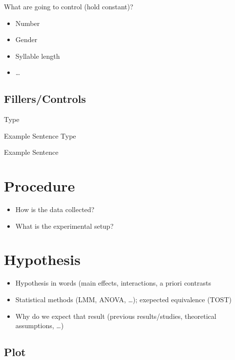 \documentclass[
    numbers=noenddot,
    open=any,
    paper=a4,
    oneside,
    pagesize,
    captions=tableheading,
    bibliography=totoc,
    11pt
    ]{scrbook}
\providecommand{\tightlist}{%
    \setlength{\itemsep}{0pt}\setlength{\parskip}{0pt}}
\begin{document}
What are going to control (hold constant)?

\begin{itemize}
\tightlist
\item
  Number
\item
  Gender
\item
  Syllable length
\item
  \ldots
\end{itemize}

\hypertarget{fillerscontrols}{%
\section{Fillers/Controls}\label{fillerscontrols}}

\begin{exe}
    \ex \begin{xlist}
        \ex Type

        Example Sentence
        \ex Type

        Example Sentence
    \end{xlist}
\end{exe}

\hypertarget{procedure}{%
\chapter{Procedure}\label{procedure}}

\begin{itemize}
\tightlist
\item
  How is the data collected?
\item
  What is the experimental setup?
\end{itemize}

\hypertarget{hypothesis}{%
\chapter{Hypothesis}\label{hypothesis}}

\begin{itemize}
\tightlist
\item
  Hypothesis in words (main effects, interactions, a priori contrasts
\item
  Statistical methods (LMM, ANOVA, \ldots); exepected equivalence (TOST)
\item
  Why do we expect that result (previous results/studies, theoretical
  assumptions, \ldots)
\end{itemize}

\hypertarget{plot}{%
\section{Plot}\label{plot}}
\end{document}
